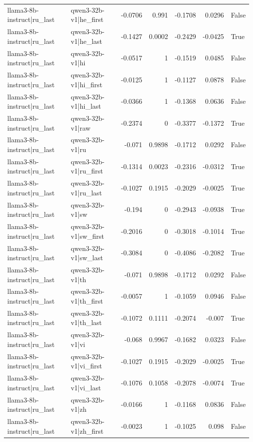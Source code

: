 \begin{table}
\begin{tabular}{l l r r r r l}
llama3-8b-instruct|ru_last & qwen3-32b-v1|he_first & -0.0706 & 0.991 & -0.1708 & 0.0296 & False \\
llama3-8b-instruct|ru_last & qwen3-32b-v1|he_last & -0.1427 & 0.0002 & -0.2429 & -0.0425 & True \\
llama3-8b-instruct|ru_last & qwen3-32b-v1|hi & -0.0517 & 1 & -0.1519 & 0.0485 & False \\
llama3-8b-instruct|ru_last & qwen3-32b-v1|hi_first & -0.0125 & 1 & -0.1127 & 0.0878 & False \\
llama3-8b-instruct|ru_last & qwen3-32b-v1|hi_last & -0.0366 & 1 & -0.1368 & 0.0636 & False \\
llama3-8b-instruct|ru_last & qwen3-32b-v1|raw & -0.2374 & 0 & -0.3377 & -0.1372 & True \\
llama3-8b-instruct|ru_last & qwen3-32b-v1|ru & -0.071 & 0.9898 & -0.1712 & 0.0292 & False \\
llama3-8b-instruct|ru_last & qwen3-32b-v1|ru_first & -0.1314 & 0.0023 & -0.2316 & -0.0312 & True \\
llama3-8b-instruct|ru_last & qwen3-32b-v1|ru_last & -0.1027 & 0.1915 & -0.2029 & -0.0025 & True \\
llama3-8b-instruct|ru_last & qwen3-32b-v1|sw & -0.194 & 0 & -0.2943 & -0.0938 & True \\
llama3-8b-instruct|ru_last & qwen3-32b-v1|sw_first & -0.2016 & 0 & -0.3018 & -0.1014 & True \\
llama3-8b-instruct|ru_last & qwen3-32b-v1|sw_last & -0.3084 & 0 & -0.4086 & -0.2082 & True \\
llama3-8b-instruct|ru_last & qwen3-32b-v1|th & -0.071 & 0.9898 & -0.1712 & 0.0292 & False \\
llama3-8b-instruct|ru_last & qwen3-32b-v1|th_first & -0.0057 & 1 & -0.1059 & 0.0946 & False \\
llama3-8b-instruct|ru_last & qwen3-32b-v1|th_last & -0.1072 & 0.1111 & -0.2074 & -0.007 & True \\
llama3-8b-instruct|ru_last & qwen3-32b-v1|vi & -0.068 & 0.9967 & -0.1682 & 0.0323 & False \\
llama3-8b-instruct|ru_last & qwen3-32b-v1|vi_first & -0.1027 & 0.1915 & -0.2029 & -0.0025 & True \\
llama3-8b-instruct|ru_last & qwen3-32b-v1|vi_last & -0.1076 & 0.1058 & -0.2078 & -0.0074 & True \\
llama3-8b-instruct|ru_last & qwen3-32b-v1|zh & -0.0166 & 1 & -0.1168 & 0.0836 & False \\
llama3-8b-instruct|ru_last & qwen3-32b-v1|zh_first & -0.0023 & 1 & -0.1025 & 0.098 & False \\

\end{tabular}
\end{table}
